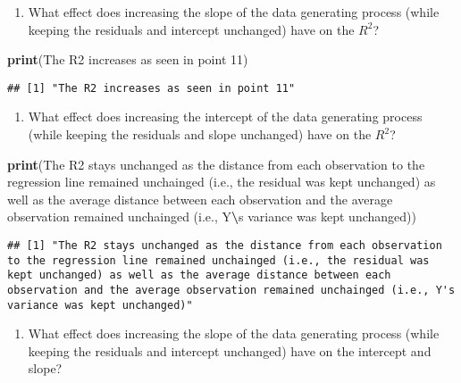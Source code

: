 \documentclass[
]{book}
\newenvironment{Shaded}{\begin{snugshade}}{\end{snugshade}}
\newcommand{\FunctionTok}[1]{\textcolor[rgb]{0.13,0.29,0.53}{\textbf{#1}}}
\newcommand{\NormalTok}[1]{#1}
\newcommand{\SpecialCharTok}[1]{\textcolor[rgb]{0.81,0.36,0.00}{\textbf{#1}}}
\newcommand{\StringTok}[1]{\textcolor[rgb]{0.31,0.60,0.02}{#1}}
\providecommand{\tightlist}{%
  \setlength{\itemsep}{0pt}\setlength{\parskip}{0pt}}
\begin{document}
\begin{enumerate}
\def\labelenumi{\roman{enumi}.}
\tightlist
\item
  What effect does increasing the slope of the data generating process (while keeping the residuals and intercept unchanged) have on the \(R^2\)?
\end{enumerate}

\begin{Shaded}
\begin{Highlighting}[]
\FunctionTok{print}\NormalTok{(}\StringTok{\textquotesingle{}The R2 increases as seen in point 11\textquotesingle{}}\NormalTok{)}
\end{Highlighting}
\end{Shaded}

\begin{verbatim}
## [1] "The R2 increases as seen in point 11"
\end{verbatim}

\begin{enumerate}
\def\labelenumi{\roman{enumi}.}
\setcounter{enumi}{1}
\tightlist
\item
  What effect does increasing the intercept of the data generating process (while keeping the residuals and slope unchanged) have on the \(R^2\)?
\end{enumerate}

\begin{Shaded}
\begin{Highlighting}[]
\FunctionTok{print}\NormalTok{(}\StringTok{\textquotesingle{}The R2 stays unchanged as the distance from each observation to the regression line remained unchainged (i.e., the residual was kept unchanged) as well as the average distance between each observation and the average observation remained unchainged (i.e., Y}\SpecialCharTok{\textbackslash{}\textquotesingle{}}\StringTok{s variance was kept unchanged)\textquotesingle{}}\NormalTok{)}
\end{Highlighting}
\end{Shaded}

\begin{verbatim}
## [1] "The R2 stays unchanged as the distance from each observation to the regression line remained unchainged (i.e., the residual was kept unchanged) as well as the average distance between each observation and the average observation remained unchainged (i.e., Y's variance was kept unchanged)"
\end{verbatim}

\begin{enumerate}
\def\labelenumi{\roman{enumi}.}
\setcounter{enumi}{2}
\tightlist
\item
  What effect does increasing the slope of the data generating process (while keeping the residuals and intercept unchanged) have on the intercept and slope?
\end{enumerate}
\end{document}
